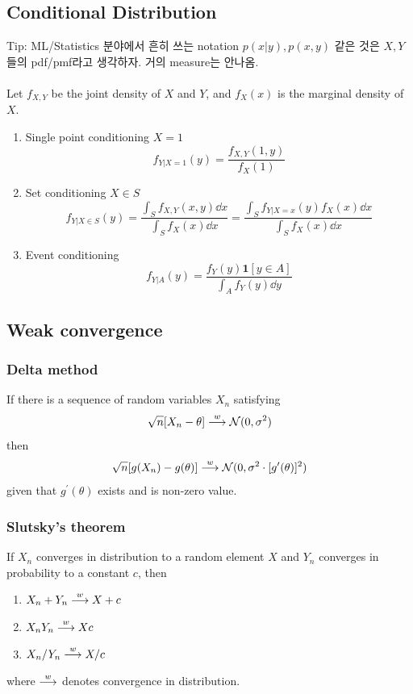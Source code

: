 \documentclass[10pt]{article}
\begin{document}
\subsection{Conditional Distribution}
\alert{Tip:} ML/Statistics 분야에서 흔히 쓰는 notation $p(x|y), p(x,y)$ 같은 것은 $X,Y$ 들의 pdf/pmf라고 생각하자. 거의 measure는 안나옴. \\~\\
Let $f_{X,Y}$ be the joint density of $X$ and $Y$, and $f_X (x)$ is the marginal density of $X$. 
\begin{enumerate}
    \item Single point conditioning $X=1$ 
    \begin{equation*}
        f_{Y | X=1} (y) = \frac{f_{X,Y} (1,y)}{f_{X} (1)} 
    \end{equation*}
    \item Set conditioning $X \in S$ 
    \begin{equation*}
    f_{Y | X \in S} (y) = \frac{\int_S f_{X,Y} (x,y) \dd{x}}{\int_S f_X (x) \dd{x}} = \frac{\int_S f_{Y | X=x}(y) f_X (x) \dd{x}}{\int_S f_{X} (x) \dd{x}}
    \end{equation*}
    \item Event conditioning 
    \begin{equation*}
        f_{Y |A} (y) = \frac{f_Y (y) \mathbf{1}[y \in A]}{\int_A f_Y (y) \dd{y}}
    \end{equation*}
 \end{enumerate}
\subsection{Weak convergence}
\subsubsection{Delta method}
If there is a sequence of random variables $X_n$ satisfying 
\begin{equation}
    \sqrt{n}[X_n - \theta] \overset{w}{\longrightarrow} \mathcal{N}(0, \sigma^2) 
\end{equation}
then 
\begin{equation}
    \sqrt{n}[g(X_n) - g(\theta)] \overset{w}{\longrightarrow} \mathcal{N}(0, \sigma^2 \cdot [g^{\prime}(\theta)]^2)
\end{equation}
given that $g^{\prime}(\theta)$ exists and is non-zero value. 
\subsubsection{Slutsky's theorem}
If $X_n$ converges in distribution to a random element $X$ and $Y_n$ converges in probability to a constant $c$, then 
\begin{enumerate}
    \item $X_n + Y_n \overset{w}{\longrightarrow} X +c$ 
    \item $X_n Y_n \overset{w}{\longrightarrow} Xc$ 
    \item$X_n / Y_n \overset{w}{\longrightarrow} X/c$
\end{enumerate}
where $\overset{w}{\longrightarrow}$ denotes convergence in distribution. 
\end{document}
